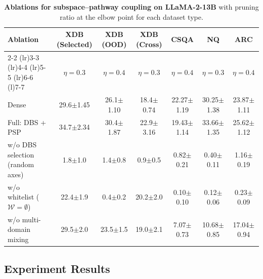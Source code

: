 \begin{table}[!t]
\centering
\footnotesize
\caption{\textbf{Ablations for subspace--pathway coupling on LLaMA-2-13B}
with pruning ratio at the elbow point for each dataset type.}
\vspace{-2mm}
\setlength{\tabcolsep}{3pt}
\renewcommand{\arraystretch}{1.00}
\begin{tabular}{l c c c c c c}
\toprule
\textbf{Ablation} &
\textbf{XDB (Selected)} &
\textbf{XDB (OOD)} &
\textbf{XDB (Cross)} &
\textbf{CSQA} &
\textbf{NQ} &
\textbf{ARC} \\
\cmidrule(lr){2-2} \cmidrule(lr){3-3} \cmidrule(lr){4-4} \cmidrule(lr){5-5} \cmidrule(lr){6-6} \cmidrule(l){7-7}
\rowcolor{lightgray} & $\eta\!=\!0.3$ & $\eta\!=\!0.4$ & $\eta\!=\!0.3$ & $\eta\!=\!0.4$ & $\eta\!=\!0.3$ & $\eta\!=\!0.4$ \\
\midrule
Dense & 29.6{\scriptsize$\pm$1.45} & 26.1{\scriptsize$\pm$1.10} & 18.4{\scriptsize$\pm$0.74} & 22.27{\scriptsize$\pm$1.19} & 30.25{\scriptsize$\pm$1.38} & 23.87{\scriptsize$\pm$1.11} \\
\addlinespace[1pt]
Full: DBS + PSP & 34.7{\scriptsize$\pm$2.34} & 30.4{\scriptsize$\pm$1.87} & 22.9{\scriptsize$\pm$3.16} & 19.43{\scriptsize$\pm$1.14} & 33.66{\scriptsize$\pm$1.35} & 25.62{\scriptsize$\pm$1.12} \\
\addlinespace[1pt]
w/o DBS selection (random axes) & 1.8{\scriptsize$\pm$1.0} & 1.4{\scriptsize$\pm$0.8} & 0.9{\scriptsize$\pm$0.5} & 0.82{\scriptsize$\pm$0.21} & 0.40{\scriptsize$\pm$0.11} & 1.16{\scriptsize$\pm$0.19} \\
w/o whitelist ($\mathcal{W}\!=\!\emptyset$) & 22.4{\scriptsize$\pm$1.9} & 0.4{\scriptsize$\pm$0.2} & 20.2{\scriptsize$\pm$2.0} & 0.10{\scriptsize$\pm$0.10} & 0.12{\scriptsize$\pm$0.06} & 0.23{\scriptsize$\pm$0.09} \\
w/o multi-domain mixing & 29.5{\scriptsize$\pm$2.0} & 23.5{\scriptsize$\pm$1.5} & 19.0{\scriptsize$\pm$2.1} & 7.07{\scriptsize$\pm$0.73} & 10.68{\scriptsize$\pm$0.85} & 17.04{\scriptsize$\pm$0.94} \\
\bottomrule
\end{tabular}
\label{tab:ablation_coupling}
\vspace{-1mm}
\end{table}

\vspace{-1mm}
\subsection{Experiment Results}
\vspace{-1mm}
